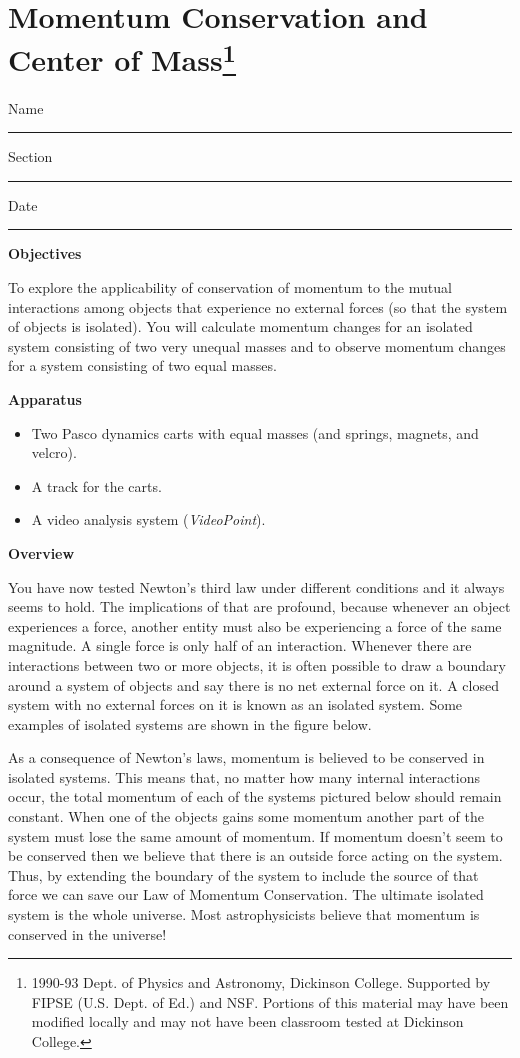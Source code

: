 
\section{Momentum Conservation and Center of Mass\footnote{
1990-93 Dept. of Physics and Astronomy, Dickinson College. Supported by FIPSE
(U.S. Dept. of Ed.) and NSF. Portions of this material may have been modified
locally and may not have been classroom tested at Dickinson College.
}}

Name \rule{2.0in}{0.1pt}\hfill{}Section \rule{1.0in}{0.1pt}\hfill{}Date \rule{1.0in}{0.1pt}

\textbf{Objectives }

To explore the applicability of conservation of momentum to the mutual interactions
among objects that experience no external forces (so that the system of objects
is isolated). You will calculate momentum changes for an isolated system consisting
of two very unequal masses and to observe momentum changes for a system consisting
of two equal masses. 

\textbf{Apparatus}

\begin{itemize}
\item Two Pasco dynamics carts with equal masses (and springs, magnets, and velcro). 
\item A track for the carts. 
\item A video analysis system (\textit{VideoPoint}).
\end{itemize}
\textbf{Overview }

You have now tested Newton's third law under different conditions and it always
seems to hold. The implications of that are profound, because whenever an object
experiences a force, another entity must also be experiencing a force of the
same magnitude. A single force is only half of an interaction. Whenever there
are interactions between two or more objects, it is often possible to draw a
boundary around a system of objects and say there is no net external force on
it. A closed system with no external forces on it is known as an isolated system.
Some examples of isolated systems are shown in the figure below.

As a consequence of Newton's laws, momentum is believed to be conserved in isolated
systems. This means that, no matter how many internal interactions occur, the
total momentum of each of the systems pictured below should remain constant.
When one of the objects gains some momentum another part of the system must
lose the same amount of momentum. If momentum doesn't seem to be conserved then
we believe that there is an outside force acting on the system. Thus, by extending
the boundary of the system to include the source of that force we can save our
Law of Momentum Conservation. The ultimate isolated system is the whole universe.
Most astrophysicists believe that momentum is conserved in the universe!

